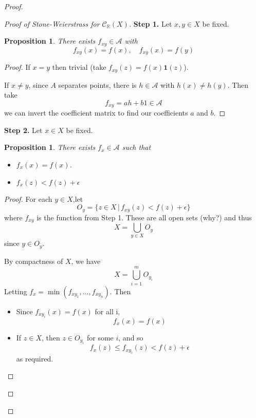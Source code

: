 \documentclass[10pt, oneside, reqno]{amsbook}
\theoremstyle{plain}%
\newtheorem{prop}[thm]{Proposition}
\theoremstyle{definition}
\theoremstyle{remark}
\newcommand{\R}{\mathbb{R}}
\begin{document}
\begin{proof}
\begin{proof}[Proof of Stone-Weierstrass for $\mathcal{C}_\R(X)$]
        \textbf{Step 1.}  Let $x,y \in X$ be fixed.  
        \begin{prop}
            There exists $f_{xy} \in \mathcal{A}$ with \[
                f_{xy}(x) = f(x), \quad f_{xy}(x) = f(y)
            \]
        \end{prop}
        \begin{proof}
            If $x = y$ then trivial (take $f_{xy}(z) = f(x) \mathbf{1}(z)$). 
            
            If $x \neq y$, since $A$ separates points, there is $h \in \mathcal{A}$ with $h(x) \neq h(y)$.  Then take \[
                f_{xy} = a h + b 1 \in \mathcal{A}
            \] we can invert the coefficient matrix to find our coefficients $a$ and $b$.  
        \end{proof}
        
        \textbf{Step 2.} Let $x \in X$ be fixed.  
        \begin{prop}
            There exists $f_x \in \mathcal{A}$ such that \begin{itemize}
                \item $f_x(x) = f(x)$.  
                \item $f_x(z) < f(z) + \epsilon$
            \end{itemize}
        \end{prop}
        \begin{proof}
            For each $y \in X$,let \[
                O_y = \{ z \in X \, | \, f_{xy}(z) < f(z) + \epsilon \}
            \] where $f_{xy}$ is the function from Step 1.  These are all open sets (why?) and thus \[
                X = \bigcup_{y \in X} O_y
            \] since $y \in O_y$.  
            
            By compactness of $X$, we have \[
                X = \bigcup_{i=1}^m O_{y_i}
            \]  Letting $f_x = \min(f_{xy_1}, \dots, f_{xy_n})$.  Then 
            \begin{itemize}
                \item Since $f_{xy_i}(x) = f(x)$ for all i, \[
                    f_x(x) = f(x)
                \]
                \item If $z \in X$, then $z \in O_{y_i}$ for some $i$, and so \[
                    f_x(z) \leq f_{x y_i}(z) < f(z) + \epsilon
                \] as required.
            \end{itemize} 
        \end{proof}
        

\end{proof}
\end{proof}
\end{document}
